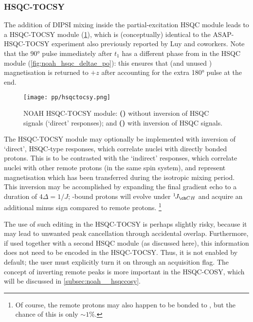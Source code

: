 \subsubsection{HSQC-TOCSY}

The addition of DIPSI mixing inside the partial-excitation HSQC module leads to a HSQC-TOCSY module (\cref{fig:hsqctocsy}), which is (conceptually) identical to the ASAP-HSQC-TOCSY experiment also previously reported by Luy and coworkers\autocite{Becker2019JMR}.
Note that the \proton{} \ang{90} pulse immediately after $t_1$ has a different phase from in the HSQC module (\cref{fig:noah_hsqc_deltae_po}): this ensures that  (and unused ) magnetisation is returned to $+z$ after accounting for the extra \ang{180} pulse at the end.

\begin{figure}[!ht]
    \centering
    \texttt{[image: pp/hsqctocsy.png]}%
    {\label{fig:hsqctocsy_base}}%
    {\label{fig:hsqctocsy_invert}}%
    \caption[NOAH HSQC-TOCSY module]{
        NOAH HSQC-TOCSY module:
        \textbf{()} without inversion of HSQC signals (`direct' responses); and
        \textbf{()} with inversion of HSQC signals.
    }
    \label{fig:hsqctocsy}
\end{figure}

The HSQC-TOCSY module may optionally be implemented with inversion of `direct', HSQC-type responses, which correlate \carbon{} nuclei with directly bonded protons.
This is to be contrasted with the `indirect' responses, which correlate \carbon{} nuclei with other remote protons (in the same spin system), and represent magnetisation which has been transferred during the isotropic mixing period.
This inversion may be accomplished by expanding the final gradient echo to a duration of $4\Delta = 1/J$; \carbon{}-bound protons will evolve under $\oneJ{CH}$ and acquire an additional minus sign compared to remote protons.%
\footnote{Of course, the remote protons may also happen to be bonded to \carbon{}, but the chance of this is only $\sim 1\%$.}

The use of such editing in the HSQC-TOCSY is perhaps slightly risky, because it may lead to unwanted peak cancellation through accidental overlap.
Furthermore, if used together with a second HSQC module (as discussed here), this information does not need to be encoded in the HSQC-TOCSY.
Thus, it is not enabled by default; the user must explicitly turn it on through an acquisition flag.
The concept of inverting remote peaks is more important in the HSQC-COSY, which will be discussed in \cref{subsec:noah__hsqccosy}.


